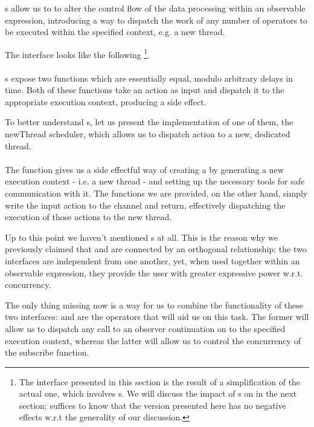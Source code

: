 s allow us to to alter the control flow of the data processing within an observable expression, introducing a way to dispatch the work of any number of operators to be executed within the specified context, e.g. a new thread.

The  interface looks like the following \footnote{The interface presented in this section is the result of a simplification of the actual one, which involves s. We will discuss the impact of s on  in the next section; suffices to know that the version presented here has no negative effects w.r.t the generality of our discussion.}.\\

\\

s expose two functions which are essentially equal, modulo arbitrary delays in time. Both of these functions take an  action as input and dispatch it to the appropriate execution context, producing a side effect. 

To better understand s, let us present the implementation of one of them, the newThread scheduler, which allows us to dispatch action to a new, dedicated thread.\\

\\

The  function gives us a side effectful way of creating a  by generating a new execution context - i.e. a new thread - and setting up the necessary tools for safe communication with it. The  functions we are provided, on the other hand, simply write the input  action to the channel and return, effectively dispatching the execution of those actions to the new thread. 

Up to this point we haven't mentioned s at all. This is the reason why we previously claimed that  and  are connected by an orthogonal relationship: the two interfaces are independent from one another, yet, when used together within an observable expression, they provide the user with greater expressive power w.r.t. concurrency. 

The only thing missing now is a way for us to combine the functionality of these two interfaces:  and  are the operators that will aid us on this task. The former will allow us to dispatch any call to an observer continuation on to the specified execution context, whereas the latter will allow us to control the concurrency of the  subscribe function.

